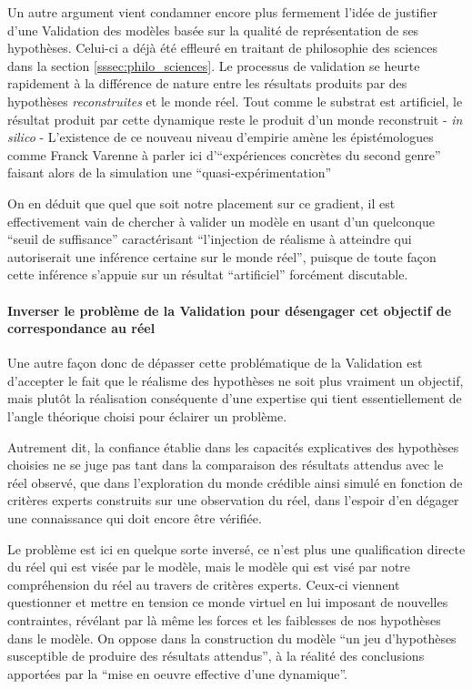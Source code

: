 Un autre argument vient condamner encore plus fermement l'idée de justifier d'une Validation des modèles basée sur la qualité de représentation de ses hypothèses. Celui-ci a déjà été effleuré en traitant de philosophie des sciences dans la section \ref{sssec:philo_sciences}. Le processus de validation se heurte rapidement à la différence de nature entre les résultats produits par des hypothèses \textit{reconstruites} et le monde réel. Tout comme le substrat est artificiel, le résultat produit par cette dynamique reste le produit d'un monde reconstruit - \textit{in silico} - L'existence de ce nouveau niveau d'empirie amène les épistémologues comme Franck Varenne à parler ici d'\enquote{expériences concrètes du second genre} faisant alors de la simulation une \enquote{quasi-expérimentation} \autocites{Varenne2001, Varenne2007, Phan2008, Phan2010}

On en déduit que quel que soit notre placement sur ce gradient, il est effectivement vain de chercher à valider un modèle en usant d'un quelconque \enquote{seuil de suffisance} caractérisant \enquote{l'injection de réalisme à atteindre qui autoriserait une inférence certaine sur le monde réel}, puisque de toute façon cette inférence s'appuie sur un résultat \enquote{artificiel} forcément discutable.

\paragraph{Inverser le problème de la Validation pour désengager cet objectif de correspondance au réel}
\label{p:inverser_problematique}

Une autre façon donc de dépasser cette problématique de la Validation est d'accepter le fait que le réalisme des hypothèses ne soit plus vraiment un objectif, mais plutôt la réalisation conséquente d'une expertise qui tient essentiellement de l'angle théorique choisi pour éclairer un problème.

Autrement dit, la confiance établie dans les capacités explicatives des hypothèses choisies ne se juge pas tant dans la comparaison des résultats attendus avec le réel observé, que dans l'exploration du monde crédible ainsi simulé en fonction de critères experts construits sur une observation du réel, dans l'espoir d'en dégager une connaissance qui doit encore être vérifiée.

Le problème est ici en quelque sorte inversé, ce n'est plus une qualification directe du réel qui est visée par le modèle, mais le modèle qui est visé par notre compréhension du réel au travers de critères experts. Ceux-ci viennent questionner et mettre en tension ce monde virtuel en lui imposant de nouvelles contraintes, révélant par là même les forces et les faiblesses de nos hypothèses dans le modèle. On oppose dans la construction du modèle \enquote{un jeu d'hypothèses susceptible de produire des résultats attendus}, à la réalité des conclusions apportées par la \enquote{mise en oeuvre effective d'une dynamique}.

